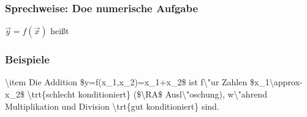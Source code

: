 \subsubsection{Sprechweise: Doe numerische Aufgabe}
$\vec{y}=f(\vec{x})$ hei\ss{}t
\subsubsection{Beispiele}
\num{
\item Die Addition $y=f(x_1,x_2)=x_1+x_2$ ist f\"ur Zahlen $x_1\approx-x_2$ \trt{schlecht konditioniert} ($\RA$ Ausl\"oschung), w\"ahrend Multiplikation und Division \trt{gut konditioniert} sind.
}


